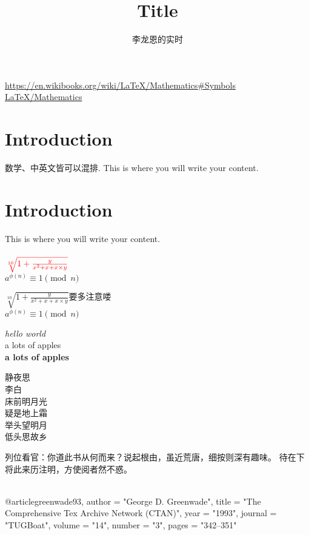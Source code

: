 \documentclass{article}
\title{Title}
\author{李龙恩的实时}
\begin{document}

\maketitle{}

\url{https://en.wikibooks.org/wiki/LaTeX/Mathematics#Symbols} \\
\href{https://en.wikibooks.org/wiki/LaTeX/Mathematics#Symbols}{LaTeX/Mathematics}
\section{Introduction}
数学、中英文皆可以混排. This is where you will write your content.
\section{Introduction}
This is where you will write your content. \\ \\
$\color{red}{\sqrt[10]{1 + \frac{y}{x^{2} + x + x \times y}}}$ \\
$a^{\phi(n)} \equiv 1 \pmod{n}$

$\sqrt[10]{1 + \frac{y}{x^{2} + x + x \times y}} \textit{要多注意喽}$ \\
$a^{\phi(n)} \equiv 1 \pmod{n}$


\textit{hello world} \\
\textrm{a lots of apples} \\
\textbf{a lots of apples} \\


\begin{pinyinscope}
静夜思 \\
李白 \\
床前明月光\\
疑是地上霜\\
举头望明月\\
低头思故乡\\
\end{pinyinscope}

\begin{pinyinscope}
列位看官：你道此书从何而来？说起根由，虽近荒唐，细按则深有趣味。
待在下将此来历注明，方使阅者然不惑。\\
 \\
\end{pinyinscope}
{}

@article{greenwade93,
    author  = "George D. Greenwade",
    title   = "The {C}omprehensive {T}ex {A}rchive {N}etwork ({CTAN})",
    year    = "1993",
    journal = "TUGBoat",
    volume  = "14",
    number  = "3",
    pages   = "342--351"
}
\end{document}
